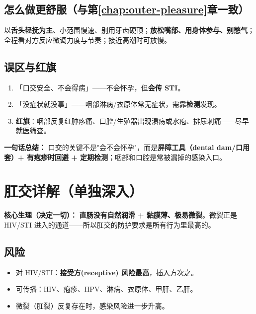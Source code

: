 \documentclass[12pt,UTF8,openany]{ctexbook}
\begin{document}
\section{怎么做更舒服（与第\ref{chap:outer-pleasure}章一致）}

以\textbf{舌头轻抚为主}、小范围慢速、别用牙齿硬顶；\textbf{放松嘴部、用身体参与、别憋气}；全程看对方反应微调力度与节奏；接近高潮时可放慢。

\section{误区与红旗}

\begin{enumerate}[leftmargin=2em,itemsep=0.3em]
  \item 「口交安全、不会得病」——不会怀孕，但\textbf{会传 STI}。
  \item 「没症状就没事」——咽部淋病/衣原体常无症状，需靠\textbf{检测}发现。
  \item \textbf{红旗}：咽部反复红肿疼痛、口腔/生殖器出现溃疡或水疱、排尿刺痛——尽早就医筛查。
\end{enumerate}

\vspace{1em}
\noindent\textbf{一句话总结：} 口交的关键不是"会不会怀孕"，而是\textbf{屏障工具（dental dam/口用套）+ 有疱疹时回避 + 定期检测}；咽部和口腔是常被漏掉的感染入口。

\chapter{肛交详解（单独深入）}
\label{chap:anal}

\noindent\textbf{核心生理（决定一切）：} \textbf{直肠没有自然润滑 + 黏膜薄、极易微裂}。微裂正是 HIV/STI 进入的通道——所以肛交的防护要求是所有行为里最高的。

\section{风险}

\begin{itemize}[leftmargin=2em,itemsep=0.3em]
  \item 对 HIV/STI：\textbf{接受方(receptive) 风险最高}，插入方次之。
  \item 可传播：HIV、疱疹、HPV、淋病、衣原体、甲肝、乙肝。
  \item 微裂（肛裂）反复存在时，感染风险进一步升高。
\end{itemize}
\end{document}
